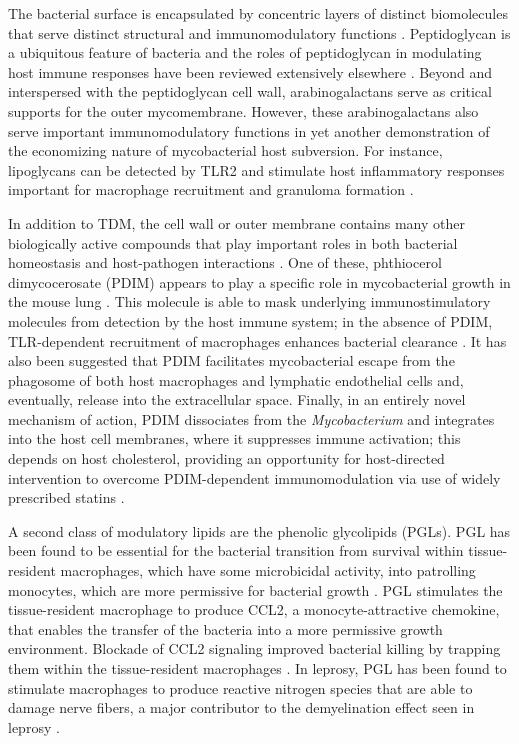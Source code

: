 The bacterial surface is encapsulated by concentric layers of distinct biomolecules that serve distinct structural and immunomodulatory functions \citep{Neyrolles2011}. Peptidoglycan is a ubiquitous feature of bacteria and the roles of peptidoglycan in modulating host immune responses have been reviewed extensively elsewhere \citep{Kang1998a, Guan2007, Wolf2018}. Beyond and interspersed with the peptidoglycan cell wall, arabinogalactans serve as critical supports for the outer mycomembrane. However, these arabinogalactans also serve important immunomodulatory functions in yet another demonstration of the economizing nature of mycobacterial host subversion. For instance, lipoglycans can be detected by TLR2 and stimulate host inflammatory responses important for macrophage recruitment and granuloma formation \citep{Gilleron2006}.

In addition to TDM, the cell wall or outer membrane contains many other biologically active compounds that play important roles in both bacterial homeostasis and host\hyp{}pathogen interactions \citep{Yu2012, Alderwick2015, Rens2021}. One of these, phthiocerol dimycocerosate (PDIM) appears to play a specific role in mycobacterial growth in the mouse lung \citep{Cox1999}. This molecule is able to mask underlying immunostimulatory molecules from detection by the host immune system; in the absence of PDIM, TLR\hyp{}dependent recruitment of macrophages enhances bacterial clearance \citep{Cambier2014b, Day2014}. It has also been suggested that PDIM facilitates mycobacterial escape from the phagosome of both host macrophages and lymphatic endothelial cells and, eventually, release into the extracellular space\citep{Quigley2017, Lerner2018}. Finally, in an entirely novel mechanism of action, PDIM dissociates from the \textit{Mycobacterium} and integrates into the host cell membranes, where it suppresses immune activation; this depends on host cholesterol, providing an opportunity for host\hyp{}directed intervention to overcome PDIM\hyp{}dependent immunomodulation via use of widely prescribed statins \citep{Cambier2020}.

A second class of modulatory lipids are the phenolic glycolipids (PGLs). PGL has been found to be essential for the bacterial transition from survival within tissue\hyp{}resident macrophages, which have some microbicidal activity, into patrolling monocytes, which are more permissive for bacterial growth \citep{Barnes2017, Sinsimer2008}. PGL stimulates the tissue\hyp{}resident macrophage to produce CCL2, a monocyte\hyp{}attractive chemokine, that enables the transfer of the bacteria into a more permissive growth environment. Blockade of CCL2 signaling improved bacterial killing by trapping them within the tissue\hyp{}resident macrophages \citep{Cambier2014b, Cambier2017}. In leprosy, PGL has been found to stimulate macrophages to produce reactive nitrogen species that are able to damage nerve fibers, a major contributor to the demyelination effect seen in leprosy \citep{Madigan2017}.

